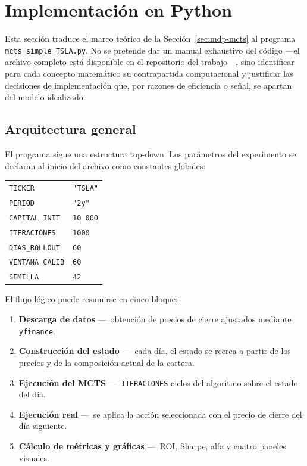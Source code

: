 \section{Implementación en Python}
\label{sec:implementacion}

Esta sección traduce el marco teórico de la Sección~\ref{sec:mdp-mcts} al programa \texttt{mcts\_simple\_TSLA.py}. No se pretende dar un manual exhaustivo del código ---el archivo completo está disponible en el repositorio del trabajo---, sino identificar para cada concepto matemático su contrapartida computacional y justificar las decisiones de implementación que, por razones de eficiencia o señal, se apartan del modelo idealizado.

\subsection{Arquitectura general}
\label{subsec:arquitectura}

El programa sigue una estructura top-down. Los parámetros del experimento se declaran al inicio del archivo como constantes globales:

\begin{center}
\begin{tabular}{ll}
\toprule
\texttt{TICKER} & \texttt{"TSLA"} \\
\texttt{PERIOD} & \texttt{"2y"} \\
\texttt{CAPITAL\_INIT} & \texttt{10\_000} \\
\texttt{ITERACIONES} & \texttt{1000} \\
\texttt{DIAS\_ROLLOUT} & \texttt{60} \\
\texttt{VENTANA\_CALIB} & \texttt{60} \\
\texttt{SEMILLA} & \texttt{42} \\
\bottomrule
\end{tabular}
\end{center}

El flujo lógico puede resumirse en cinco bloques:
\begin{enumerate}
    \item \textbf{Descarga de datos} ---~obtención de precios de cierre ajustados mediante \texttt{yfinance}.
    \item \textbf{Construcción del estado} ---~cada día, el estado se recrea a partir de los precios y de la composición actual de la cartera.
    \item \textbf{Ejecución del MCTS} ---~\texttt{ITERACIONES} ciclos del algoritmo sobre el estado del día.
    \item \textbf{Ejecución real} ---~se aplica la acción seleccionada con el precio de cierre del día siguiente.
    \item \textbf{Cálculo de métricas y gráficas} ---~ROI, Sharpe, alfa y cuatro paneles visuales.
\end{enumerate}

